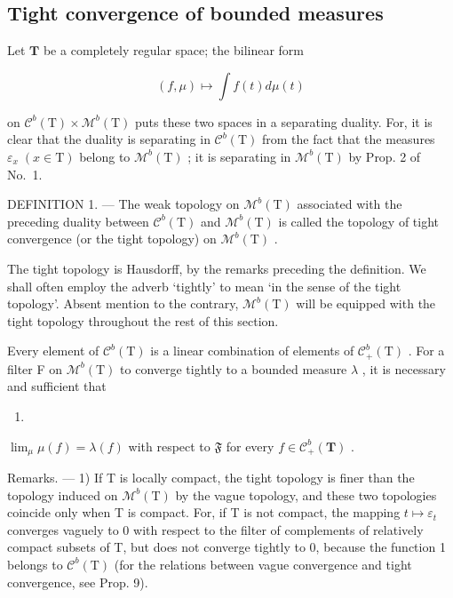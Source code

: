 \subsection{Tight convergence of bounded measures}

Let \(\mathbf{T}\) be a completely regular space; the bilinear form

\[
(f, \mu) \mapsto \int f (t) d \mu (t)
\]

on \(\mathcal{C}^{b}(\mathrm{T})\times\mathcal{M}^{b}(\mathrm{T})\) puts these two spaces in a separating duality. For, it is clear that the duality is separating in \(\mathcal{C}^{b}(\mathrm{T})\) from the fact that the measures \(\varepsilon_{x}\;(x\in\mathrm{T})\) belong to \(\mathcal{M}^{b}(\mathrm{T})\) ; it is separating in \(\mathcal{M}^{b}(\mathrm{T})\) by Prop. 2 of No.~1.

DEFINITION 1. --- The weak topology on \(\mathcal{M}^{b}(\mathrm{T})\) associated with the preceding duality between \(\mathcal{C}^{b}(\mathrm{T})\) and \(\mathcal{M}^{b}(\mathrm{T})\) is called the topology of tight convergence (or the tight topology) on \(\mathcal{M}^{b}(\mathrm{T})\) .

The tight topology is Hausdorff, by the remarks preceding the definition. We shall often employ the adverb `tightly' to mean `in the sense of the tight topology'. Absent mention to the contrary, \(\mathcal{M}^b (\mathrm{T})\) will be equipped with the tight topology throughout the rest of this section.

Every element of \(\mathcal{C}^{b}(\mathrm{T})\) is a linear combination of elements of \(\mathcal{C}_{+}^{b}(\mathrm{T})\) . For a filter F on \(\mathcal{M}^{b}(\mathrm{T})\) to converge tightly to a bounded measure \(\lambda\) , it is necessary and sufficient that

\begin{enumerate}
\def\labelenumi{(\arabic{enumi})}
\setcounter{enumi}{3}
\tightlist
\item
\end{enumerate}

\(\lim_{\mu} \mu(f) = \lambda(f)\) with respect to \(\mathfrak{F}\) for every \(f \in \mathcal{C}_+^b(\mathbf{T})\) .

Remarks. --- 1) If T is locally compact, the tight topology is finer than the topology induced on \(\mathcal{M}^{b}(\mathrm{T})\) by the vague topology, and these two topologies coincide only when T is compact. For, if T is not compact, the mapping \(t \mapsto \varepsilon_{t}\) converges vaguely to 0 with respect to the filter of complements of relatively compact subsets of T, but does not converge tightly to 0, because the function 1 belongs to \(\mathcal{C}^{b}(\mathrm{T})\) (for the relations between vague convergence and tight convergence, see Prop. 9).

